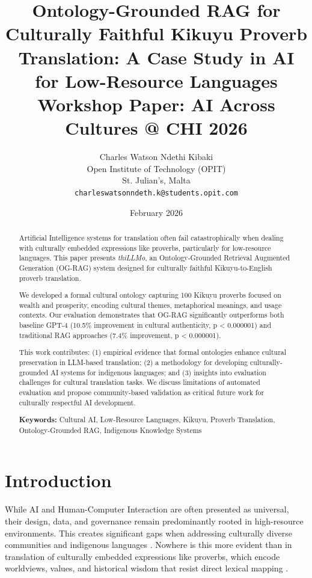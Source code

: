 \documentclass[11pt,twocolumn]{article}
\title{\textbf{Ontology-Grounded RAG for Culturally Faithful Kikuyu Proverb Translation: A Case Study in AI for Low-Resource Languages}\\
\vspace{0.5em}
\large Workshop Paper: AI Across Cultures @ CHI 2026}
\author{
Charles Watson Ndethi Kibaki\\
Open Institute of Technology (OPIT)\\
St. Julian's, Malta\\
\texttt{charleswatsonndeth.k@students.opit.com}
}
\date{February 2026}
\begin{document}
\maketitle

\begin{abstract}
\noindent Artificial Intelligence systems for translation often fail catastrophically when dealing with culturally embedded expressions like proverbs, particularly for low-resource languages. This paper presents \textit{thiLLMo}, an Ontology-Grounded Retrieval Augmented Generation (OG-RAG) system designed for culturally faithful Kikuyu-to-English proverb translation. 

We developed a formal cultural ontology capturing 100 Kikuyu proverbs focused on wealth and prosperity, encoding cultural themes, metaphorical meanings, and usage contexts. Our evaluation demonstrates that OG-RAG significantly outperforms both baseline GPT-4 (10.5\% improvement in cultural authenticity, p < 0.000001) and traditional RAG approaches (7.4\% improvement, p < 0.000001).

This work contributes: (1) empirical evidence that formal ontologies enhance cultural preservation in LLM-based translation; (2) a methodology for developing culturally-grounded AI systems for indigenous languages; and (3) insights into evaluation challenges for cultural translation tasks. We discuss limitations of automated evaluation and propose community-based validation as critical future work for culturally respectful AI development.

\textbf{Keywords:} Cultural AI, Low-Resource Languages, Kikuyu, Proverb Translation, Ontology-Grounded RAG, Indigenous Knowledge Systems
\end{abstract}

\section{Introduction}

While AI and Human-Computer Interaction are often presented as universal, their design, data, and governance remain predominantly rooted in high-resource environments. This creates significant gaps when addressing culturally diverse communities and indigenous languages \cite{nekoto2020participatory}. Nowhere is this more evident than in translation of culturally embedded expressions like proverbs, which encode worldviews, values, and historical wisdom that resist direct lexical mapping \cite{finnegan2012oral}.
\end{document}
